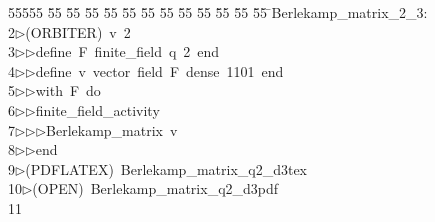 %
%
\begin{tabbing}
55555 \= 55 \= 55 \= 55 \= 55 \= 55 \= 55 \= 55 \= 55 \= 55 \= 55 \= 55 \= 55 \= \>Berlekamp\_matrix\_2\_3:\\[0pt]
2\>$\triangleright$\>(ORBITER)\ v\ 2\ \\[0pt]
3\>$\triangleright$\>$\triangleright$\>define\ F\ finite\_field\ q\ 2\ end\ \\[0pt]
4\>$\triangleright$\>$\triangleright$\>define\ v\ vector\ field\ F\ dense\ 1101\ end\ \\[0pt]
5\>$\triangleright$\>$\triangleright$\>with\ F\ do\ \\[0pt]
6\>$\triangleright$\>$\triangleright$\>finite\_field\_activity\ \\[0pt]
7\>$\triangleright$\>$\triangleright$\>$\triangleright$\>Berlekamp\_matrix\ v\ \\[0pt]
8\>$\triangleright$\>$\triangleright$\>end\\[0pt]
9\>$\triangleright$\>(PDFLATEX)\ Berlekamp\_matrix\_q2\_d3tex\\[0pt]
10\>$\triangleright$\>(OPEN)\ Berlekamp\_matrix\_q2\_d3pdf\\[0pt]
11\>\end{tabbing}
